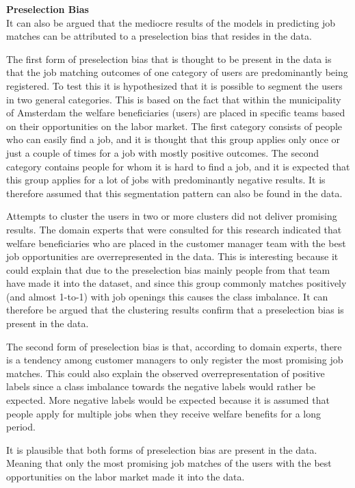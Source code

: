 \noindent
\textbf{Preselection Bias} \\
It can also be argued that the mediocre results of the models in predicting job matches can be attributed to a preselection bias that resides in the data. 

The first form of preselection bias that is thought to be present in the data is that the job matching outcomes of one category of users are predominantly being registered.
To test this it is hypothesized that it is possible to segment the users in two general categories.
This is based on the fact that within the municipality of Amsterdam the welfare beneficiaries (users) are placed in specific teams based on their opportunities on the labor market. 
The first category consists of people who can easily find a job, and it is thought that this group applies only once or just a couple of times for a job with mostly positive outcomes. 
The second category contains people for whom it is hard to find a job, and it is expected that this group applies for a lot of jobs with predominantly negative results.
It is therefore assumed that this segmentation pattern can also be found in the data.

Attempts to cluster the users in two or more clusters did not deliver promising results.
The domain experts that were consulted for this research indicated that welfare beneficiaries who are placed in the customer manager team with the best job opportunities are overrepresented in the data.  
This is interesting because it could explain that due to the preselection bias mainly people from that team have made it into the dataset, and since this group commonly matches positively (and almost 1-to-1) with job openings this causes the class imbalance.
It can therefore be argued that the clustering results confirm that a preselection bias is present in the data. 

The second form of preselection bias is that, according to domain experts, there is a tendency among customer managers to only register the most promising job matches.
This could also explain the observed overrepresentation of positive labels since a class imbalance towards the negative labels would rather be expected.
More negative labels would be expected because it is assumed that people apply for multiple jobs when they receive welfare benefits for a long period. 

It is plausible that both forms of preselection bias are present in the data.
Meaning that only the most promising job matches of the users with the best opportunities on the labor market made it into the data.

